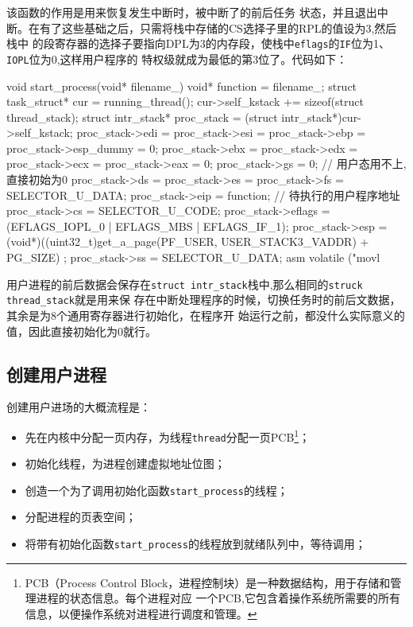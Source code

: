 该函数的作用是用来恢复发生中断时，被中断了的前后任务
状态，并且退出中断。在有了这些基础之后，只需将栈中存储的CS选择子里的RPL的值设为3,然后栈中
的段寄存器的选择子要指向DPL为3的内存段，使栈中\texttt{eflags}的\texttt{IF}位为1、
\texttt{IOPL}位为0,这样用户程序的
特权级就成为最低的第3位了。代码如下：
\begin{ccode}
void start_process(void* filename_)
{
   void* function = filename_;
   struct task_struct* cur = running_thread();
   cur->self_kstack += sizeof(struct thread_stack);
   struct intr_stack* proc_stack = (struct intr_stack*)cur->self_kstack;	 
   proc_stack->edi = proc_stack->esi = proc_stack->ebp = proc_stack->esp_dummy = 0;
   proc_stack->ebx = proc_stack->edx = proc_stack->ecx = proc_stack->eax = 0;
   proc_stack->gs = 0;		 // 用户态用不上,直接初始为0
   proc_stack->ds = proc_stack->es = proc_stack->fs = SELECTOR_U_DATA;
   proc_stack->eip = function;	 // 待执行的用户程序地址
   proc_stack->cs = SELECTOR_U_CODE;
   proc_stack->eflags = (EFLAGS_IOPL_0 | EFLAGS_MBS | EFLAGS_IF_1);
   proc_stack->esp = (void*)((uint32_t)get_a_page(PF_USER, USER_STACK3_VADDR) + PG_SIZE) ;
   proc_stack->ss = SELECTOR_U_DATA; 
   asm volatile ("movl %
 }
\end{ccode}
用户进程的前后数据会保存在\texttt{struct intr\_stack}栈中,那么相同的\texttt{struck thread\_stack}就是用来保
存在中断处理程序的时候，切换任务时的前后文数据，其余是为8个通用寄存器进行初始化，在程序开
始运行之前，都没什么实际意义的值，因此直接初始化为0就行。

\subsection{创建用户进程}
创建用户进场的大概流程是：
\begin{itemize}
\item 先在内核中分配一页内存，为线程\texttt{thread}分配一页PCB\footnote{PCB（Process
    Control Block，进程控制块）是一种数据结构，用于存储和管理进程的状态信息。每个进程对应
    一个PCB,它包含着操作系统所需要的所有信息，以便操作系统对进程进行调度和管理。}；
\item 初始化线程，为进程创建虚拟地址位图；
\item 创造一个为了调用初始化函数\texttt{start\_process}的线程；
\item 分配进程的页表空间；
\item 将带有初始化函数\texttt{start\_process}的线程放到就绪队列中，等待调用；
\end{itemize}

